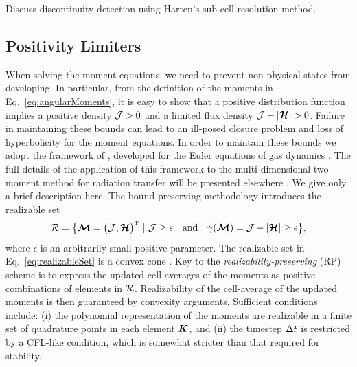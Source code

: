 \documentclass[10pt,preprint]{aastex}
\newcommand{\ee}[1]{{\color{red} #1}}
\begin{document}
\ee{Discuss discontinuity detection using Harten's sub-cell resolution method.}

\subsection{Positivity Limiters}
\label{sec:positivityLimiters}

When solving the moment equations, we need to prevent non-physical states from developing.  
In particular, from the definition of the moments in Eq.~\eqref{eq:angularMoments}, it is easy to show that a positive distribution function implies a positive density $\mathcal{J}>0$ and a limited flux density $\cJ-|\bcH|>0$.  
Failure in maintaining these bounds can lead to an ill-posed closure problem and loss of hyperbolicity for the moment equations.  
In order to maintain these bounds we adopt the framework of \citet{ZS2010b}, developed for the Euler equations of gas dynamics \citep[see also][]{ZS2010a,ZS2011,OHF2012}.  
The full details of the application of this framework to the multi-dimensional two-moment method for radiation transfer will be presented elsewhere \citep{endeveHauck_2017}.  
We give only a brief description here.  
The bound-preserving methodology introduces the realizable set
\begin{equation}
  \mathcal{R}=\big\{\boldsymbol{\mathcal{M}}=\big(\mathcal{J},\boldsymbol{\mathcal{H}}\big)^{\mbox{\tiny T}}~|~\mathcal{J}\ge\epsilon\quad\text{and}\quad\gamma(\boldsymbol{\mathcal{M}})=\mathcal{J}-|\boldsymbol{\mathcal{H}}|\ge\epsilon\big\},
  \label{eq:realizableSet}
\end{equation}
where $\epsilon$ is an arbitrarily small positive parameter.  
The realizable set in Eq.~\eqref{eq:realizableSet} is a convex cone \citep{OHF2012}.  
Key to the \emph{realizability-preserving} (RP) scheme is to express the updated cell-averages of the moments as positive combinations of elements in $\mathcal{R}$.  
Realizability of the cell-average of the updated moments is then guaranteed by convexity arguments.  
Sufficient conditions include: (i) the polynomial representation of the moments are realizable in a finite set of quadrature points in each element $\boldsymbol{K}$, and (ii) the timestep $\Delta t$ is restricted by a CFL-like condition, which is somewhat stricter than that required for stability.  
\end{document}
